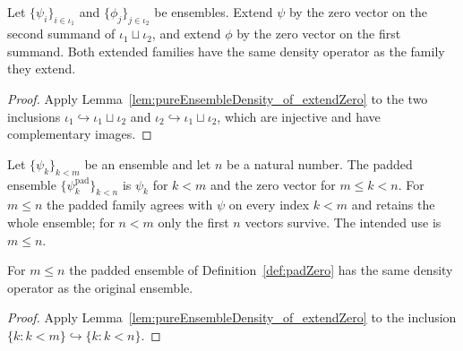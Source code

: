 \begin{lemma}
    \label{lem:pureEnsembleDensity_sumElim_zero}
    \leanok
    Let $\{\psi_i\}_{i \in \iota_1}$ and $\{\phi_j\}_{j \in \iota_2}$ be
    ensembles. Extend $\psi$ by the zero vector on the second summand of
    $\iota_1 \sqcup \iota_2$, and extend $\phi$ by the zero vector on the first
    summand. Both extended families have the same density operator as the
    family they extend.
\end{lemma}

\begin{proof}
    \leanok
    Apply Lemma~\ref{lem:pureEnsembleDensity_of_extendZero} to the two
    inclusions $\iota_1 \hookrightarrow \iota_1 \sqcup \iota_2$ and
    $\iota_2 \hookrightarrow \iota_1 \sqcup \iota_2$, which are injective and
    have complementary images.
\end{proof}

\begin{definition}
    \label{def:padZero}
    \leanok
    Let $\{\psi_k\}_{k < m}$ be an ensemble and let $n$ be a natural number.
    The padded ensemble $\{\psi_k^{\mathrm{pad}}\}_{k < n}$ is $\psi_k$ for
    $k < m$ and the zero vector for $m \le k < n$. For $m \le n$ the padded
    family agrees with $\psi$ on every index $k < m$ and retains the whole
    ensemble; for $n < m$ only the first $n$ vectors survive. The intended use
    is $m \le n$.
\end{definition}

\begin{lemma}
    \label{lem:pureEnsembleDensity_padZero}
    \leanok
    For $m \le n$ the padded ensemble of Definition~\ref{def:padZero} has the
    same density operator as the original ensemble.
\end{lemma}

\begin{proof}
    \leanok
    Apply Lemma~\ref{lem:pureEnsembleDensity_of_extendZero} to the inclusion
    $\{k : k < m\} \hookrightarrow \{k : k < n\}$.
\end{proof}

